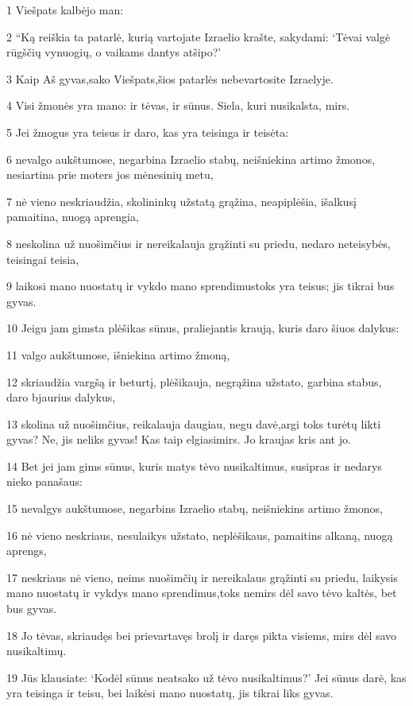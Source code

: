 \par 1 Viešpats kalbėjo man: 
\par 2 “Ką reiškia ta patarlė, kurią vartojate Izraelio krašte, sakydami: ‘Tėvai valgė rūgščių vynuogių, o vaikams dantys atšipo?’ 
\par 3 Kaip Aš gyvas,­sako Viešpats,­šios patarlės nebevartosite Izraelyje. 
\par 4 Visi žmonės yra mano: ir tėvas, ir sūnus. Siela, kuri nusikalsta, mirs. 
\par 5 Jei žmogus yra teisus ir daro, kas yra teisinga ir teisėta: 
\par 6 nevalgo aukštumose, negarbina Izraelio stabų, neišniekina artimo žmonos, nesiartina prie moters jos mėnesinių metu, 
\par 7 nė vieno neskriaudžia, skolininkų užstatą grąžina, neapiplėšia, išalkusį pamaitina, nuogą aprengia, 
\par 8 neskolina už nuošimčius ir nereikalauja grąžinti su priedu, nedaro neteisybės, teisingai teisia, 
\par 9 laikosi mano nuostatų ir vykdo mano sprendimus­toks yra teisus; jis tikrai bus gyvas. 
\par 10 Jeigu jam gimsta plėšikas sūnus, praliejantis kraują, kuris daro šiuos dalykus: 
\par 11 valgo aukštumose, išniekina artimo žmoną, 
\par 12 skriaudžia vargšą ir beturtį, plėšikauja, negrąžina užstato, garbina stabus, daro bjaurius dalykus, 
\par 13 skolina už nuošimčius, reikalauja daugiau, negu davė,­argi toks turėtų likti gyvas? Ne, jis neliks gyvas! Kas taip elgiasi­mirs. Jo kraujas kris ant jo. 
\par 14 Bet jei jam gims sūnus, kuris matys tėvo nusikaltimus, susipras ir nedarys nieko panašaus: 
\par 15 nevalgys aukštumose, negarbins Izraelio stabų, neišniekins artimo žmonos, 
\par 16 nė vieno neskriaus, nesulaikys užstato, neplėšikaus, pamaitins alkaną, nuogą aprengs, 
\par 17 neskriaus nė vieno, neims nuošimčių ir nereikalaus grąžinti su priedu, laikysis mano nuostatų ir vykdys mano sprendimus,­toks nemirs dėl savo tėvo kaltės, bet bus gyvas. 
\par 18 Jo tėvas, skriaudęs bei prievartavęs brolį ir daręs pikta visiems, mirs dėl savo nusikaltimų. 
\par 19 Jūs klausiate: ‘Kodėl sūnus neatsako už tėvo nusikaltimus?’ Jei sūnus darė, kas yra teisinga ir teisu, bei laikėsi mano nuostatų, jis tikrai liks gyvas. 
